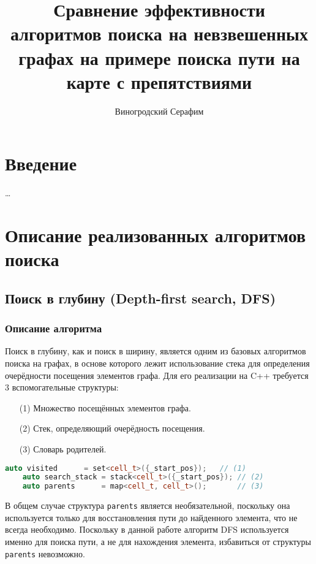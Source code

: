 \documentclass[a4paper, 12pt]{article}
\title{Сравнение эффективности алгоритмов поиска на невзвешенных графах на примере поиска пути на карте с препятствиями}
\author{Виногродский Серафим}
\begin{document}
\begin{titlepage}
    \maketitle
    \tableofcontents
    \thispagestyle{empty}
\end{titlepage}

\section{Введение}
\ldots

\section{Описание реализованных алгоритмов поиска}
\subsection{Поиск в глубину (Depth-first search, DFS)}
\subsubsection{Описание алгоритма}
\label{ssub:DFS_algorithm}
Поиск в глубину, как и поиск в ширину, является одним из базовых алгоритмов поиска на графах, в основе которого лежит использование стека для определения очерёдности посещения элементов графа. Для его реализации на C++ требуется 3 вспомогательные структуры:
\begin{itemize}
    \item[(1)] Множество посещённых элементов графа.
    \item[(2)] Стек, определяющий очерёдность посещения.
    \item[(3)] Словарь родителей.
\end{itemize}

\begin{lstlisting}[language=C++]
    auto visited      = set<cell_t>({_start_pos});   // (1)
    auto search_stack = stack<cell_t>({_start_pos}); // (2)
    auto parents      = map<cell_t, cell_t>();       // (3)
\end{lstlisting}

В общем случае структура \verb|parents| является необязательной, поскольку она используется только для восстановления пути до найденного элемента, что не всегда необходимо. Поскольку в данной работе алгоритм DFS используется именно для поиска пути, а не для нахождения элемента, избавиться от структуры \verb|parents| невозможно.
\end{document}
